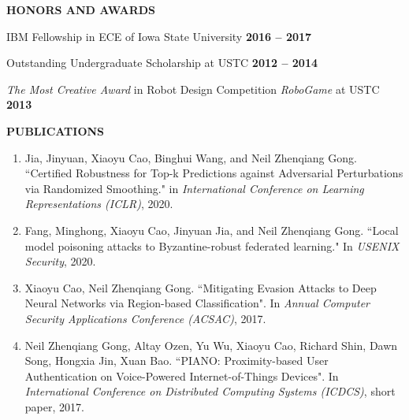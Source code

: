 \documentclass[11pt]{article}
\begin{document}
\begin{spacing}{1}
\vspace{3mm}
{\bf \Large HONORS AND AWARDS}\\
\vspace{-4mm}
\begin{list}{}{\leftmargin=4em}
\item IBM Fellowship in ECE of Iowa State University \hfill{\textbf{2016 -- 2017}} \vspace{-2mm}
\item Outstanding Undergraduate Scholarship at USTC \hfill{\textbf{2012 -- 2014}} \vspace{-2mm}
\item \emph{The Most Creative Award} in Robot Design Competition \emph{RoboGame} at USTC  \hfill{\textbf{2013}}  \vspace{0cm}
\end{list}



\vspace{3mm}
{\bf \Large PUBLICATIONS}

\begin{enumerate}[leftmargin=4.5em]


\item Jia, Jinyuan, Xiaoyu Cao, Binghui Wang, and Neil Zhenqiang Gong. ``Certified Robustness for Top-k Predictions against Adversarial Perturbations via Randomized Smoothing." in \emph{International Conference on Learning Representations (ICLR)}, 2020.

\item Fang, Minghong, Xiaoyu Cao, Jinyuan Jia, and Neil Zhenqiang Gong. ``Local model poisoning attacks to Byzantine-robust federated learning." In \emph{USENIX Security}, 2020.

\item Xiaoyu Cao, Neil Zhenqiang Gong. ``Mitigating Evasion Attacks to Deep Neural Networks via Region-based Classification". In \emph{Annual Computer Security Applications Conference (ACSAC)}, 2017.

\item Neil Zhenqiang Gong, Altay Ozen, Yu Wu, Xiaoyu Cao, Richard Shin, Dawn Song, Hongxia Jin, Xuan Bao. ``PIANO: Proximity-based User Authentication on Voice-Powered Internet-of-Things Devices". In \emph{International Conference on Distributed Computing Systems (ICDCS)}, short paper, 2017. 




\end{enumerate}
\end{spacing}
\end{document}
